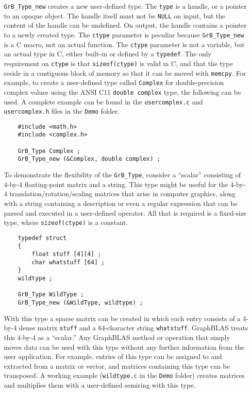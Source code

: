 \documentclass[12pt]{article}
\begin{document}
\verb'GrB_Type_new' creates a new user-defined type.  The \verb'type' is a
handle, or a pointer to an opaque object.  The handle itself must not be
\verb'NULL' on input, but the content of the handle can be undefined.  On
output, the handle contains a pointer to a newly created type.  The
\verb'ctype' parameter is peculiar because \verb'GrB_Type_new' is a C macro,
not an actual function.  The \verb'ctype' parameter is not a variable, but an
actual type in C, either built-in or defined by a \verb'typedef'.  The only
requirement on \verb'ctype' is that \verb'sizeof(ctype)' is valid in C, and
that the type reside in a contiguous block of memory so that it can be moved
with \verb'memcpy'.  For example, to create a user-defined type called
\verb'Complex' for double-precision complex values using the ANSI C11
\verb'double complex' type, the following can be used.  A complete example can
be found in the \verb'usercomplex.c' and \verb'usercomplex.h' files in the
\verb'Demo' folder.

    {\footnotesize
    \begin{verbatim}
    #include <math.h>
    #include <complex.h>

    GrB_Type Complex ;
    GrB_Type_new (&Complex, double complex) ;    \end{verbatim} }

To demonstrate the flexibility of the \verb'GrB_Type', consider a ``scalar''
consisting of 4-by-4 floating-point matrix and a string.  This type might be
useful for the 4-by-4 translation/rotation/scaling matrices that arise in
computer graphics, along with a string containing a description or even a
regular expression that can be parsed and executed in a user-defined operator.
All that is required is a fixed-size type, where \verb'sizeof(ctype)' is
a constant.

    {\footnotesize
    \begin{verbatim}
    typedef struct
    {
        float stuff [4][4] ;
        char whatstuff [64] ;
    }
    wildtype ;

    GrB_Type WildType ;
    GrB_Type_new (&WildType, wildtype) ; \end{verbatim} }

With this type a sparse matrix can be created in which each entry consists of a
4-by-4 dense matrix \verb'stuff' and a 64-character string \verb'whatstuff'.
GraphBLAS treats this 4-by-4 as a ``scalar.'' Any GraphBLAS method or operation
that simply moves data can be used with this type without any further
information from the user application.  For example, entries of this type can
be assigned to and extracted from a matrix or vector, and matrices containing
this type can be transposed.  A working example (\verb'wildtype.c'
in the \verb'Demo' folder) creates matrices and multiplies them with
a user-defined semiring with this type.
\end{document}
